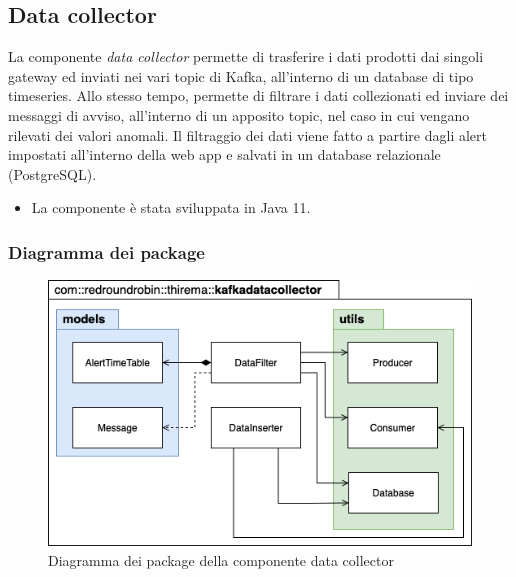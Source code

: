 \subsection{Data collector}
	La componente \textit{data collector} permette di trasferire i dati prodotti dai singoli gateway ed inviati nei vari topic di Kafka, all'interno di un database di tipo timeseries.
	\newline
	Allo stesso tempo, permette di filtrare i dati collezionati ed inviare dei messaggi di avviso, all'interno di un apposito topic, nel caso in cui vengano rilevati dei valori anomali.
	\newline
	Il filtraggio dei dati viene fatto a partire dagli alert impostati all'interno della web app e salvati in un database relazionale (PostgreSQL).
	\begin{itemize}
		\item La componente è stata sviluppata in Java 11.
	\end{itemize}
	
		\subsubsection{Diagramma dei package}%
		\begin{figure}[H]
				\centering
				\includegraphics[scale=0.600]{res/images/DATACOLLECTOR/Packagekafkadatacollector.png}
				\caption{Diagramma dei package della componente data collector}
				\label{Diagramma 5}
			\end{figure}
